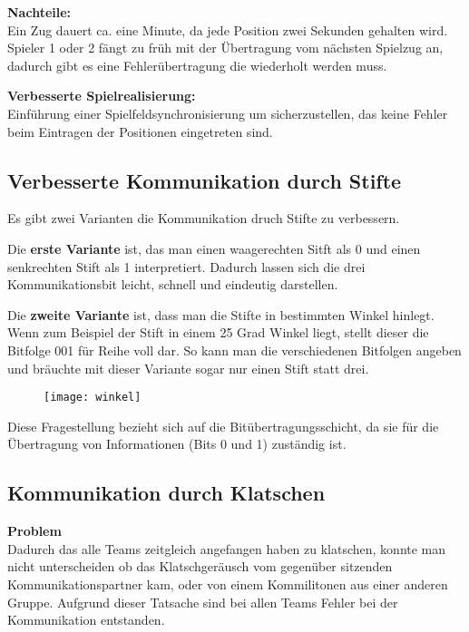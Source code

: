 \documentclass{scrartcl}
\begin{document}
 \textbf{Nachteile:}\\
  Ein Zug dauert ca. eine Minute, da jede Position zwei Sekunden gehalten wird. Spieler 1 oder 2 fängt zu früh mit der Übertragung vom nächsten Spielzug an, dadurch gibt es eine Fehlerübertragung die wiederholt werden muss.
  
  \textbf{Verbesserte Spielrealisierung:}\\
  Einführung einer Spielfeldsynchronisierung um sicherzustellen, das keine Fehler beim Eintragen der Positionen eingetreten sind. 
  
  \subsection[Aufgabe 5 Verbesserte Kommunikation durch Stifte]{Verbesserte Kommunikation durch Stifte}
  
  Es gibt zwei Varianten die Kommunikation druch Stifte zu verbessern.
  
  Die \textbf{erste Variante} ist, das man einen waagerechten Sitft als 0 und einen senkrechten Stift als 1 interpretiert. Dadurch lassen sich die drei Kommunikationsbit leicht, schnell und eindeutig darstellen.
  
  Die \textbf{zweite Variante} ist, dass man die Stifte in bestimmten Winkel hinlegt. Wenn zum Beispiel der Stift in einem 25 Grad Winkel liegt, stellt dieser die Bitfolge 001 für Reihe voll dar. So kann man die verschiedenen Bitfolgen angeben und bräuchte mit dieser Variante sogar nur einen Stift statt drei.
  
  \begin{figure}[htbp]
  \centering
    \texttt{[image: winkel]}
  \end{figure}
  
  Diese Fragestellung bezieht sich auf die Bitübertragungsschicht, da sie für die Übertragung von Informationen (Bits 0 und 1) zuständig ist.
  
  \newpage
   \subsection[Aufgabe 6 Kommunikation durch Klatschen]{Kommunikation durch Klatschen}
   
   \textbf{Problem}\\
   Dadurch das alle Teams zeitgleich angefangen haben zu klatschen, konnte man nicht unterscheiden ob das Klatschgeräusch vom gegenüber sitzenden Kommunikationspartner kam, oder von einem Kommilitonen aus einer anderen Gruppe. Aufgrund dieser Tatsache sind bei allen Teams Fehler bei der Kommunikation entstanden.
   
\end{document}
